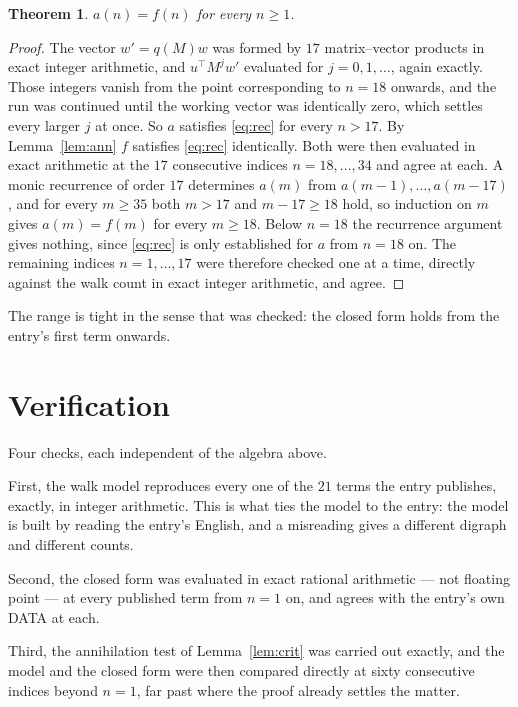 \documentclass[11pt,a4paper]{article}
\theoremstyle{plain}
\newtheorem{theorem}{Theorem}
\theoremstyle{definition}
\begin{document}
\begin{theorem}
$a(n)=f(n)$ for every $n\ge1$.
\end{theorem}

\begin{proof}
The vector $w'=q(M)w$ was formed by $17$ matrix--vector products in exact integer
arithmetic, and $u^{\!\top}M^{j}w'$ evaluated for $j=0,1,\dots$, again exactly. Those integers
vanish from the point corresponding to $n=18$ onwards, and the run was continued until the
working vector was identically zero, which settles every larger $j$ at once. So $a$ satisfies
\eqref{eq:rec} for every $n>17$. By Lemma~\ref{lem:ann} $f$ satisfies \eqref{eq:rec}
identically. Both were then evaluated in exact arithmetic at the $17$ consecutive indices
$n=18,\dots,34$ and agree at each. A monic recurrence of order $17$
determines $a(m)$ from $a(m-1),\dots,a(m-17)$, and for every $m\ge35$ both
$m>17$ and $m-17\ge18$ hold, so induction on $m$ gives $a(m)=f(m)$ for every
$m\ge18$.
Below $n=18$ the recurrence argument gives nothing, since \eqref{eq:rec} is only
established for $a$ from $n=18$ on. The remaining indices $n=1,\dots,17$ were
therefore checked one at a time, directly against the walk count in exact integer arithmetic,
and agree.
\end{proof}

The range is tight in the sense that was checked: the closed form holds from the entry's first term onwards.

\section{Verification}

Four checks, each independent of the algebra above.

First, the walk model reproduces every one of the $21$ terms the entry publishes,
exactly, in integer arithmetic. This is what ties the model to the entry: the model is built
by reading the entry's English, and a misreading gives a different digraph and different
counts.

Second, the closed form was evaluated in exact rational arithmetic --- not floating point ---
at every published term from $n=1$ on, and agrees with the entry's own DATA at each.

Third, the annihilation test of Lemma~\ref{lem:crit} was carried out exactly, and the model
and the closed form were then compared directly at sixty consecutive indices beyond
$n=1$, far past where the proof already settles the matter.
\end{document}

